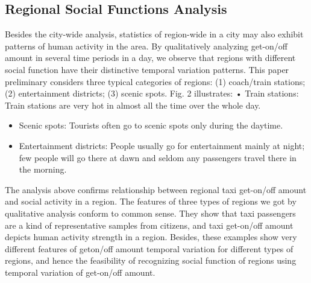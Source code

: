 \documentclass[a4paper, 10pt, conference]{ieeeconf}      %
\begin{document}
\subsection{Regional Social Functions Analysis}Besides the city-wide analysis, statistics of region-wide in a city may also exhibit patterns of human activity in the area. By qualitatively analyzing get-on/off amount in several time periods in a day, we observe that regions with different social function have their distinctive temporal variation patterns.
This paper preliminary considers three typical categories of regions: (1) coach/train stations; (2) entertainment districts; (3) scenic spots. Fig. 2 illustrates: • Train stations: Train stations are very hot in almost all the time over the whole day.


\begin{itemize}

\item Scenic spots: Tourists often go to scenic spots only during the daytime.
\item Entertainment districts: People usually go for entertainment mainly at night; few people will go there at dawn and seldom any passengers travel there in the morning.

\end{itemize}

The analysis above confirms relationship between regional taxi get-on/off amount and social activity in a region. The features of three types of regions we got by qualitative analysis conform to common sense. They show that taxi passengers are a kind of representative samples from citizens, and taxi get-on/off amount depicts human activity strength in a region. Besides, these examples show very different features of geton/off amount temporal variation for different types of regions, and hence the feasibility of recognizing social function of regions using temporal variation of get-on/off amount.
\end{document}
